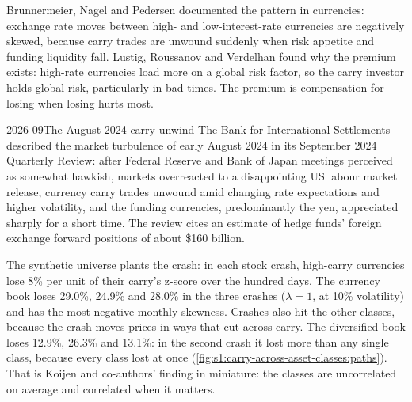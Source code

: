 Brunnermeier, Nagel and Pedersen documented the pattern in currencies: exchange rate moves between high- and low-interest-rate currencies are negatively
skewed, because carry trades are unwound suddenly when risk appetite and funding liquidity fall. Lustig, Roussanov and Verdelhan found why the premium
exists: high-rate currencies load more on a global risk factor, so the carry investor holds global risk, particularly in bad times. The premium is
compensation for losing when losing hurts most.

\begin{dated}{2026-09}{The August 2024 carry unwind}\label{dat:s1:carry-across-asset-classes:yen}
The Bank for International Settlements described the market turbulence of early August 2024 in its September 2024 Quarterly Review: after Federal
Reserve and Bank of Japan meetings perceived as somewhat hawkish, markets overreacted to a disappointing US labour market release, currency carry trades
unwound amid changing rate expectations and higher volatility, and the funding currencies, predominantly the yen, appreciated sharply for a short time.
The review cites an estimate of hedge funds' foreign exchange forward positions of about \$160 billion.
\end{dated}

The synthetic universe plants the crash: in each stock crash, high-carry currencies lose 8\% per unit of their carry's z-score over the hundred days.
The currency book loses 29.0\%, 24.9\% and 28.0\% in the three crashes ($\lambda = 1$, at 10\% volatility) and has the most negative monthly skewness.
Crashes also hit the other classes, because the crash moves prices in ways that cut across carry. The diversified book loses 12.9\%, 26.3\% and
13.1\%: in the second crash it lost more than any single class, because every class lost at once (\cref{fig:s1:carry-across-asset-classes:paths}). That
is Koijen and co-authors' finding in miniature: the classes are uncorrelated on average and correlated when it matters.

